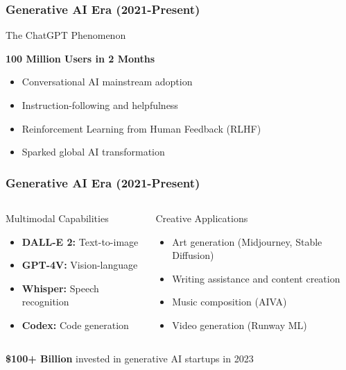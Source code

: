 \documentclass{beamer}
\begin{document}
\begin{frame}
    \frametitle{Generative AI Era (2021-Present)}
    \begin{alertblock}{The ChatGPT Phenomenon}
        \begin{center}
            \textbf{100 Million Users in 2 Months}
        \end{center}
        \begin{itemize}
            \item Conversational AI mainstream adoption
            \item Instruction-following and helpfulness
            \item Reinforcement Learning from Human Feedback (RLHF)
            \item Sparked global AI transformation
        \end{itemize}
    \end{alertblock}
\end{frame}  

\begin{frame}
    \frametitle{Generative AI Era (2021-Present)}
    \begin{columns}
        \begin{column}{0.48\textwidth}
            \begin{block}{Multimodal Capabilities}
                \begin{itemize}
                    \item \textbf{DALL-E 2:} Text-to-image
                    \item \textbf{GPT-4V:} Vision-language
                    \item \textbf{Whisper:} Speech recognition
                    \item \textbf{Codex:} Code generation
                \end{itemize}
            \end{block}
        \end{column}
        \begin{column}{0.48\textwidth}
            \begin{exampleblock}{Creative Applications}
                \begin{itemize}
                    \item Art generation (Midjourney, Stable Diffusion)
                    \item Writing assistance and content creation
                    \item Music composition (AIVA)
                    \item Video generation (Runway ML)
                \end{itemize}
            \end{exampleblock}
        \end{column}
    \end{columns}
    
    \begin{center}
        \textcolor{MyBlue}{\textbf{\$100+ Billion}} invested in generative AI startups in 2023
    \end{center}
\end{frame}
\end{document}
